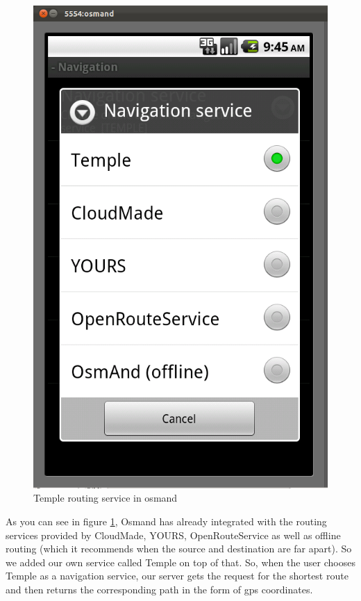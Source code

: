 \documentclass[a4paper,12pt, notitlepage, oneside, onecolumn]{article}
\begin{document}
\begin{figure}[H]
\begin{minipage}[b]{0.5\linewidth}
\centering
\includegraphics[scale=0.3]{navigation.png}
\caption{Temple routing service in osmand}
\label{fig:navigation}
\end{minipage}
\centering
\end{figure}
As you can see in figure \ref{fig:navigation}, Osmand  has already integrated with the routing services provided by CloudMade, YOURS, OpenRouteService as well as offline routing (which it recommends when the source and destination are far apart). So we added our own service called Temple on top of that. So, when the user chooses Temple as a navigation service, our server gets the request for the shortest route and then returns the corresponding path in the form of gps coordinates.
\end{document}
